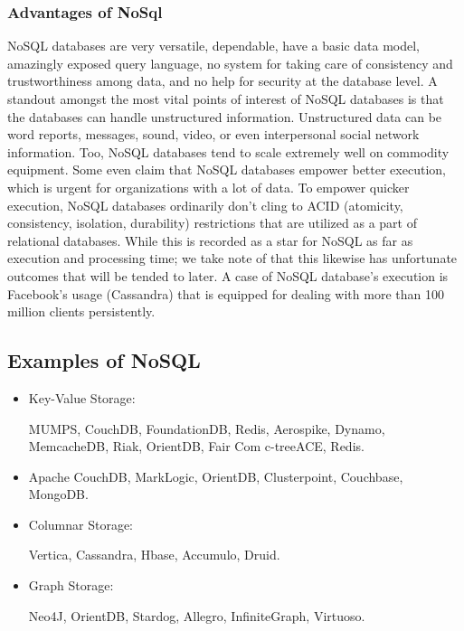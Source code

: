\subsubsection{Advantages of NoSql}
NoSQL databases are very versatile, dependable, have a basic data model, amazingly exposed query language, no system for taking care of consistency and trustworthiness among data, and no help for security at the database level. A standout amongst the most vital points of interest of NoSQL databases is that the databases can handle unstructured information. Unstructured data can be word reports, messages, sound, video, or even interpersonal social network information. Too, NoSQL databases tend to scale extremely well on commodity equipment. Some even claim that NoSQL databases empower better execution, which is urgent for organizations with a lot of data. To empower quicker execution, NoSQL databases ordinarily don't cling to ACID (atomicity, consistency, isolation, durability) restrictions that are utilized as a part of relational databases. While this is recorded as a star for NoSQL as far as execution and processing time; we take note of that this likewise has unfortunate outcomes that will be tended to later. A case of NoSQL database's execution is Facebook's usage (Cassandra) that is equipped for dealing with more than 100 million clients persistently. \cite{AdvantagesnoSql}

\subsection{Examples of NoSQL}
\begin{itemize}
\item Key-Value Storage: \par
MUMPS, CouchDB, FoundationDB, Redis, Aerospike, Dynamo, MemcacheDB, Riak, OrientDB, Fair Com c-treeACE, Redis.

\item Apache CouchDB, MarkLogic, OrientDB, Clusterpoint, Couchbase, MongoDB.

\item Columnar Storage:  \par
Vertica, Cassandra, Hbase, Accumulo, Druid.

\item Graph Storage:  \par
Neo4J, OrientDB, Stardog, Allegro, InfiniteGraph, Virtuoso. 
\end{itemize}

